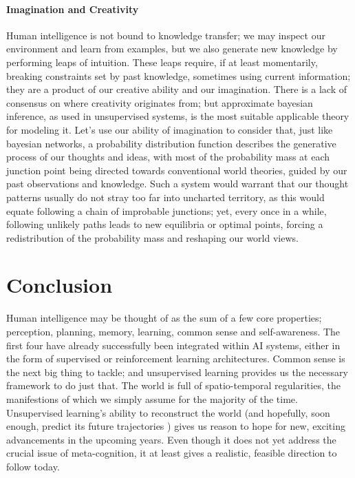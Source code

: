 \documentclass[]{article}
\begin{document}
\paragraph{Imagination and Creativity} Human intelligence is not bound to knowledge transfer; we may inspect our environment and learn from examples, but we also generate new knowledge by performing leaps of intuition. These leaps require, if at least momentarily, breaking constraints set by past knowledge, sometimes using current information; they are a product of our creative ability and our imagination. There is a lack of consensus on where creativity originates from; but approximate bayesian inference, as used in unsupervised systems, is the most suitable applicable theory for modeling it. Let's use our ability of imagination to consider that, just like bayesian networks, a  probability distribution function describes the generative process of our thoughts and ideas, with most of the probability mass at each junction point being directed towards conventional world theories, guided by our past observations and knowledge. Such a system would warrant that our thought patterns usually do not stray too far into uncharted territory, as this would equate following a chain of improbable junctions; yet, every once in a while, following unlikely paths leads to new equilibria or optimal points, forcing a redistribution of the probability mass and reshaping our world views.


\section{Conclusion}
Human intelligence may be thought of as the sum of a few core properties; perception, planning, memory, learning, common sense and self-awareness. The first four have already successfully been integrated within AI systems, either in the form of supervised or reinforcement learning architectures. Common sense is the next big thing to tackle; and unsupervised learning provides us the necessary framework to do just that. The world is full of spatio-temporal regularities, the manifestions of which we simply assume for the majority of the time. Unsupervised learning's ability to reconstruct the world (and hopefully, soon enough, predict its future trajectories \cite{lecun2016}) gives us reason to hope for new, exciting advancements in the upcoming years. Even though it does not yet address the crucial issue of meta-cognition, it at least gives a realistic, feasible direction to follow today.



\end{document}
